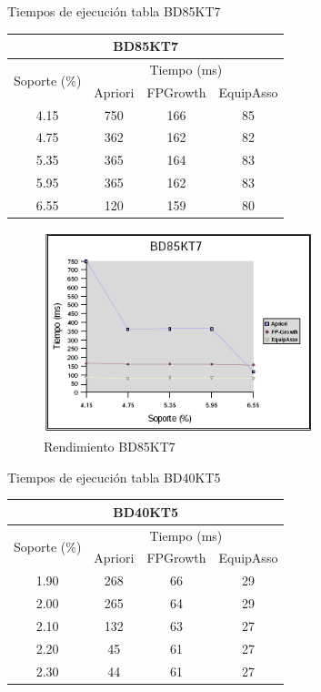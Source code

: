 \begin{table}[h]
\caption{Tiempos de ejecuci\'on tabla BD85KT7}
\end{table}
\begin{center}
\begin{tabular}{|*{4}{c|}} \hline
\multicolumn{4}{|c|}{\textbf{BD85KT7}}\\ \hline\hline
\multirow{2}{*}{Soporte (\%)} & \multicolumn{3}{|c|}{Tiempo (ms)}\\ \cline{2-4}
     & Apriori & FPGrowth & EquipAsso\\ \hline
4.15 & 750 & 166 & 85\\ \hline
4.75 & 362 & 162 & 82\\ \hline
5.35 & 365 & 164 & 83\\ \hline
5.95 & 365 & 162 & 83\\ \hline
6.55 & 120 & 159 & 80\\ \hline
\end{tabular}
\end{center}

\begin{figure}[h]
\centering
\includegraphics[width=0.7\textwidth]{images/bd85kt7.png}
\caption{Rendimiento BD85KT7}
\label{85k1}
\end{figure}

\begin{table}[h]
\caption{Tiempos de ejecuci\'on tabla BD40KT5}
\end{table}
\begin{center}
\begin{tabular}{|*{4}{c|}} \hline
\multicolumn{4}{|c|}{\textbf{BD40KT5}}\\ \hline\hline
\multirow{2}{*}{Soporte (\%)} & \multicolumn{3}{|c|}{Tiempo (ms)}\\ \cline{2-4}
     & Apriori & FPGrowth & EquipAsso\\ \hline
1.90 & 268 & 66 & 29\\ \hline
2.00 & 265 & 64 & 29\\ \hline
2.10 & 132 & 63 & 27\\ \hline
2.20 &  45 & 61 & 27\\ \hline
2.30 &  44 & 61 & 27\\ \hline
\end{tabular}
\end{center}

